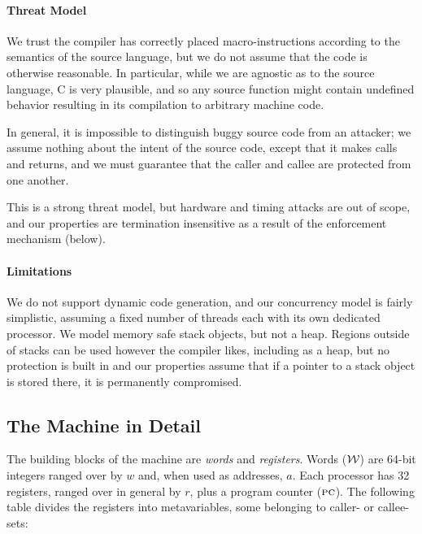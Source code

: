 \documentclass[10pt,conference]{ieeetran}%
\theoremstyle{definition}
\begin{document}
\paragraph*{Threat Model}

We trust the compiler has correctly placed macro-instructions according to
the semantics of the source language, but we do not assume that the code
is otherwise reasonable. In particular, while we are agnostic as to the source
language, C is very plausible, and so any source function might contain undefined
behavior resulting in its compilation to arbitrary machine code.

In general, it is impossible to distinguish buggy source code from an attacker;
we assume nothing about the intent of the source code, except that it makes calls
and returns, and we must guarantee that the caller and callee are protected from one
another.

This is a strong threat model, but hardware and timing attacks are out of scope,
and our properties are termination insensitive as a result of the enforcement mechanism
(below).

\paragraph*{Limitations}

We do not support dynamic code generation, and our concurrency model is fairly
simplistic, assuming a fixed number of threads each with its own dedicated processor.
We model memory safe stack objects, but not a heap. Regions outside of
stacks can be used however the compiler likes, including as a heap, but no protection is
built in and our properties assume that if a pointer to a stack object is stored there,
it is permanently compromised.

\subsection{The Machine in Detail}
\label{sec:prelim}

The building blocks of the machine are {\em words} and {\em registers}.
Words (\({\mathcal W}\)) are 64-bit integers ranged over by \(w\) and, when used as addresses,
\(a\). Each processor has 32 registers, ranged over in general by \(r\),
plus a program counter (\(\textsc{pc}\)). The following table divides
the registers into metavariables, some belonging to caller- or callee- sets:
\end{document}
